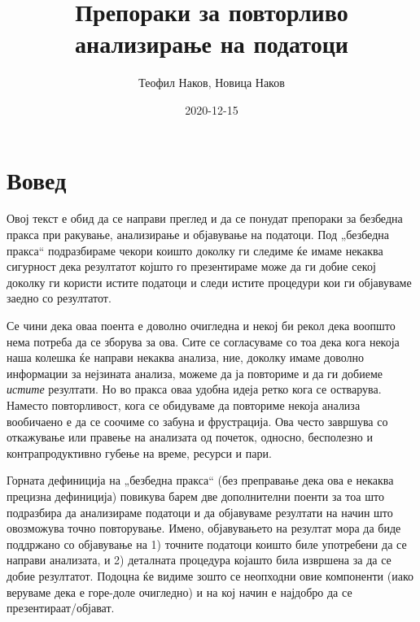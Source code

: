 \documentclass[
]{book}
\title{Препораки за повторливо анализирање на податоци}
\author{Теофил Наков, Новица Наков}
\date{2020-12-15}
\begin{document}
\maketitle

{
\setcounter{tocdepth}{1}
\tableofcontents
}
\hypertarget{intro}{%
\chapter{Вовед}\label{intro}}

Овој текст е обид да се направи преглед и да се понудат препораки за безбедна пракса при ракување, анализирање и објавување на податоци. Под „безбедна пракса`` подразбираме чекори коишто доколку ги следиме ќе имаме некаква сигурност дека резултатот којшто го презентираме може да ги добие секој доколку ги користи истите податоци и следи истите процедури кои ги објавуваме заедно со резултатот.

Се чини дека оваа поента е доволно очигледна и некој би рекол дека воопшто нема потреба да се зборува за ова. Сите се согласуваме со тоа дека кога некоја наша колешка ќе направи некаква анализа, ние, доколку имаме доволно информации за нејзината анализа, можеме да ја повториме и да ги добиеме \emph{истите} резултати. Но во пракса оваа удобна идеја ретко кога се остварува. Наместо повторливост, кога се обидуваме да повториме некоја анализа вообичаено е да се соочиме со забуна и фрустрација. Ова често завршува со откажување или правење на анализата од почеток, односно, бесполезно и контрапродуктивно губење на време, ресурси и пари.

Горната дефиниција на „безбедна пракса`` (без преправање дека ова е некаква прецизна дефиниција) повикува барем две дополнителни поенти за тоа што подразбира да анализираме податоци и да објавуваме резултати на начин што овозможува точно повторување. Имено, објавувањето на резултат мора да биде поддржано со објавување на 1) точните податоци коишто биле употребени да се направи анализата, и 2) деталната процедура којашто била извршена за да се добие резултатот. Подоцна ќе видиме зошто се неопходни овие компоненти (иако веруваме дека е горе-доле очигледно) и на кој начин е најдобро да се презентираат/објават.
\end{document}
